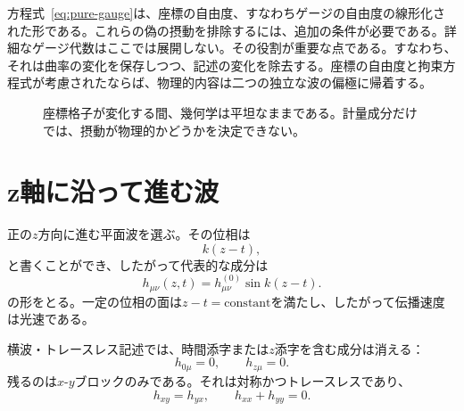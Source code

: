 方程式~\eqref{eq:pure-gauge}は、座標の自由度、すなわちゲージの自由度の線形化された形である。これらの偽の摂動を排除するには、追加の条件が必要である。詳細なゲージ代数はここでは展開しない。その役割が重要な点である。すなわち、それは曲率の変化を保存しつつ、記述の変化を除去する。座標の自由度と拘束方程式が考慮されたならば、物理的内容は二つの独立な波の偏極に帰着する。

\begin{figure}[htbp]
\centering
{}
\caption{座標格子が変化する間、幾何学は平坦なままである。計量成分だけでは、摂動が物理的かどうかを決定できない。}
\end{figure}

\section{z軸に沿って進む波}

正の\(z\)方向に進む平面波を選ぶ。その位相は
\begin{equation}
 k(z-t),
\end{equation}
と書くことができ、したがって代表的な成分は
\begin{equation}
 h_{\mu\nu}(z,t)
 =h_{\mu\nu}^{(0)}\sin k(z-t).
 \label{eq:plane-wave}
\end{equation}
の形をとる。一定の位相の面は\(z-t=\text{constant}\)を満たし、したがって伝播速度は光速である。

横波・トレースレス記述では、時間添字または\(z\)添字を含む成分は消える：
\begin{equation}
 h_{0\mu}=0,
 \qquad
 h_{z\mu}=0.
 \label{eq:tt-transverse}
\end{equation}
残るのは\(x\)-\(y\)ブロックのみである。それは対称かつトレースレスであり、
\begin{equation}
 h_{xy}=h_{yx},
 \qquad
 h_{xx}+h_{yy}=0.
 \label{eq:tt-trace}
\end{equation}

